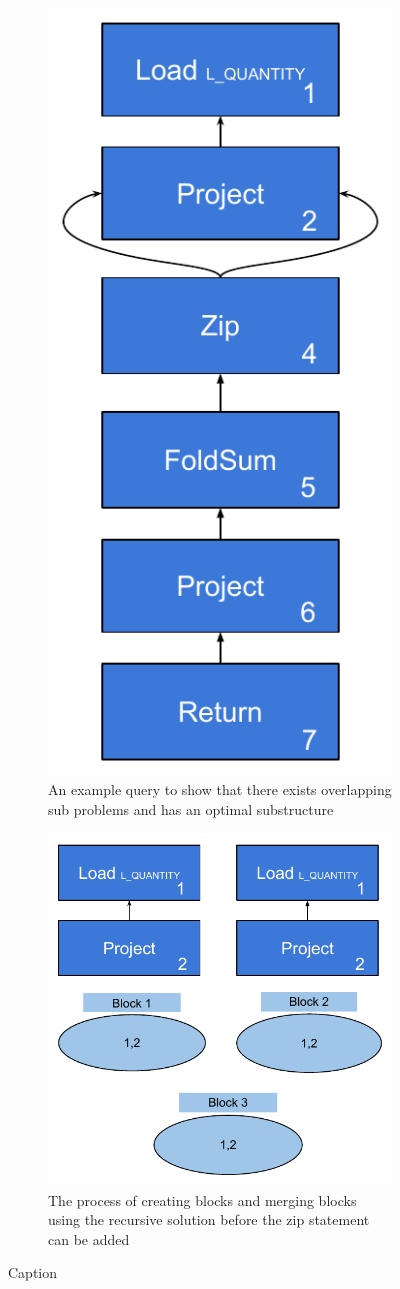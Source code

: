 \begin{figure}
    \centering
    \begin{subfigure}{0.5\linewidth}
        \centering
        \includegraphics[width=0.5\linewidth]{appendix/DPExplain.pdf}
        \caption{An example query to show that there exists overlapping sub problems and has an optimal substructure}
        \label{fig:DPSimpleQuery}
    \end{subfigure}
    \begin{subfigure}{\linewidth}
        \centering
        \includegraphics[width=0.5\linewidth]{appendix/DPExplainFrag.pdf}
        \caption{The process of creating blocks and merging blocks using the recursive solution before the zip statement can be added}
        \label{fig:DPSimpleQueryFrag}
    \end{subfigure}
    \caption{Caption}
    \label{fig:my_label}
\end{figure}

